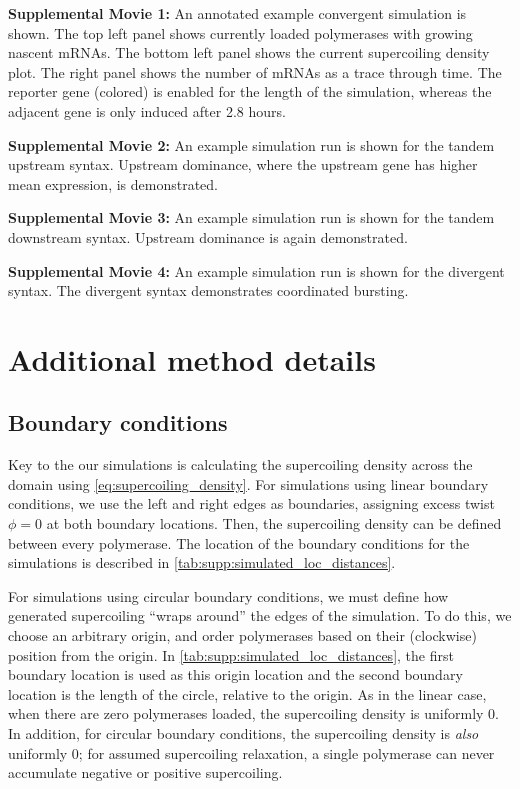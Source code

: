 \documentclass[11pt]{article}
\begin{document}
\FloatBarrier

{\small \noindent \textbf{Supplemental Movie 1:} An annotated example convergent simulation is shown. The top left panel shows currently loaded polymerases with growing nascent mRNAs. The bottom left panel shows the current supercoiling density plot. The right panel shows the number of mRNAs as a trace through time. The reporter gene (colored) is enabled for the length of the simulation, whereas the adjacent gene is only induced after 2.8 hours.}

{\small \noindent \textbf{Supplemental Movie 2:} An example simulation run is shown for the tandem upstream syntax. Upstream dominance, where the upstream gene has higher mean expression, is demonstrated.}

{\small \noindent \textbf{Supplemental Movie 3:} An example simulation run is shown for the tandem downstream syntax. Upstream dominance is again demonstrated.}

{\small \noindent \textbf{Supplemental Movie 4:} An example simulation run is shown for the divergent syntax. The divergent syntax demonstrates coordinated bursting.}

\section{Additional method details}



\subsection{Boundary conditions} \label{sec:appendix:bcs}

Key to the our simulations is calculating the supercoiling density across the domain using \cref{eq:supercoiling_density}.
For simulations using linear boundary conditions, we use the left and right edges as boundaries, assigning excess twist \(\phi = 0\) at both boundary locations. Then, the supercoiling density can be defined between every polymerase. The location of the boundary conditions for the simulations is described in \cref{tab:supp:simulated_loc_distances}.

For simulations using circular boundary conditions, we must define how generated supercoiling ``wraps around'' the edges of the simulation. To do this, we choose an arbitrary origin, and order polymerases based on their (clockwise) position from the origin. In \cref{tab:supp:simulated_loc_distances}, the first boundary location is used as this origin location and the second boundary location is the length of the circle, relative to the origin. As in the linear case, when there are zero polymerases loaded, the supercoiling density is uniformly 0. In addition, for circular boundary conditions, the supercoiling density is \emph{also} uniformly 0; for assumed supercoiling relaxation, a single polymerase can never accumulate negative or positive supercoiling.
\end{document}
